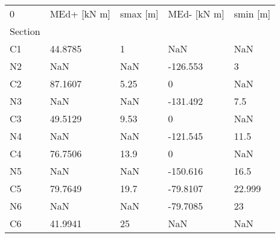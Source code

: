 \begin{tabular}{lllll}
\toprule
0 & MEd+ [kN m] & smax [m] & MEd- [kN m] & smin [m] \\
Section &             &          &             &          \\
\midrule
C1      &     44.8785 &        1 &         NaN &      NaN \\
N2      &         NaN &      NaN &    -126.553 &        3 \\
C2      &     87.1607 &     5.25 &           0 &      NaN \\
N3      &         NaN &      NaN &    -131.492 &      7.5 \\
C3      &     49.5129 &     9.53 &           0 &      NaN \\
N4      &         NaN &      NaN &    -121.545 &     11.5 \\
C4      &     76.7506 &     13.9 &           0 &      NaN \\
N5      &         NaN &      NaN &    -150.616 &     16.5 \\
C5      &     79.7649 &     19.7 &    -79.8107 &   22.999 \\
N6      &         NaN &      NaN &    -79.7085 &       23 \\
C6      &     41.9941 &       25 &         NaN &      NaN \\
\bottomrule
\end{tabular}
